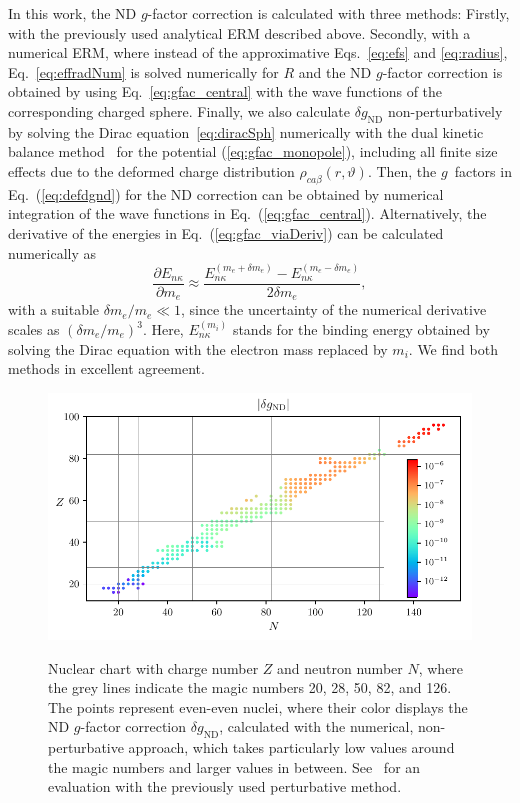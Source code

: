 In this work, the ND $g$-factor correction is calculated with three methods:
Firstly, with the previously used analytical ERM described above. Secondly, with a numerical ERM, where instead of the approximative Eqs.~\eqref{eq:efs} and \eqref{eq:radius}, Eq.~\eqref{eq:effradNum} is solved numerically for $R$ and the ND $g$-factor correction is obtained by using Eq.~\eqref{eq:gfac_central} with the wave functions of the corresponding charged sphere.
Finally, we also calculate $\delta g_{\text{ND}}$ non-perturbatively by solving the Dirac equation~\eqref{eq:diracSph} numerically with the dual kinetic balance method~\cite{dualkinetic} for the potential (\ref{eq:gfac_monopole}), including all finite size effects due to the deformed charge distribution $\rho_{ca\beta}(r,\vartheta)$. Then, the $g$~factors in Eq.~(\ref{eq:defdgnd}) for the ND correction can be obtained by numerical integration of the wave functions in Eq.~(\ref{eq:gfac_central}). Alternatively, the derivative of the energies in Eq.~(\ref{eq:gfac_viaDeriv}) can be calculated numerically as 
\begin{equation}
\frac{\partial E_{n\kappa}}{\partial m_e} \approx \frac{E_{n\kappa}^{(m_e+\delta m_e)}-E_{n\kappa}^{(m_e-\delta m_e)}}{2 \delta m_e},
\end{equation}
with a suitable ${\delta m_e / m_e}{\ll}{1}$, since the uncertainty of the numerical derivative scales as $(\delta m_e/m_e)^3$. Here, $E_{n\kappa}^{(m_i)}$ stands for the binding energy obtained by solving the Dirac equation with the electron mass replaced by $m_i$. We find both methods in excellent agreement.

\begin{figure}
  \centering
  \begin{minipage}[b]{\textwidth}
    \centering
    \includegraphics[width=\textwidth]{pics/dgnuclchart.pdf}\\
    \caption{\label{fig:dg}Nuclear chart with charge number $Z$ and neutron number $N$, where the grey lines indicate the magic numbers 20, 28, 50, 82, and 126. The points represent even-even nuclei, where their color displays the ND $g$-factor correction $\delta g_{\text{ND}}$, calculated with the numerical, non-perturbative approach, which takes particularly low values around the magic numbers and larger values in between. See~\cite{michel2015} for an evaluation with the previously used perturbative method.}
  \end{minipage}
\end{figure}

